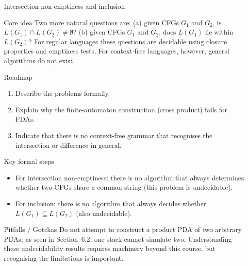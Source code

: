 \begin{frame}[t]{Intersection non‑emptiness and inclusion}
  \begin{tblock}{Core idea}
    Two more natural questions are: (a) given CFGs $G_1$ and $G_2$, is
    $L(G_1) \cap L(G_2) \ne \emptyset$?  (b) given CFGs $G_1$ and $G_2$,
    does $L(G_1)$ lie within $L(G_2)$?  For regular languages these
    questions are decidable using closure properties and emptiness tests.
    For context‑free languages, however, general algorithms do not exist.
  \end{tblock}
  \begin{tblock}{Roadmap}
    \begin{enumerate}
      \item Describe the problems formally.
      \item Explain why the finite‑automaton construction (cross
        product) fails for PDAs.
      \item Indicate that there is no context‑free grammar that
        recognises the intersection or difference in general.
    \end{enumerate}
  \end{tblock}
  \begin{tblock}{Key formal steps}
    \begin{itemize}
      \item For intersection non‑emptiness: there is no algorithm that
        always determines whether two CFGs share a common string (this
        problem is undecidable).
      \item For inclusion: there is no algorithm that always decides
        whether $L(G_1) \subseteq L(G_2)$ (also undecidable).
    \end{itemize}
  \end{tblock}
  \begin{talert}{Pitfalls / Gotchas}
    Do not attempt to construct a product PDA of two arbitrary PDAs; as
    seen in Section 6.2, one stack cannot simulate two.  Understanding
    these undecidability results requires machinery beyond this course,
    but recognising the limitations is important.
  \end{talert}
  \label{fr:6.3-08}
\end{frame}

